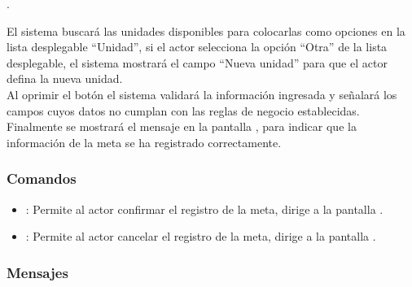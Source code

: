   \newpage .
	\newpage  
	\newpage  
  	\newpage
	\newpage
  
  El sistema buscará las unidades disponibles para colocarlas como opciones en la lista desplegable ``Unidad'', si el actor selecciona la opción ``Otra'' de la lista desplegable, el sistema mostrará
  el campo ``Nueva unidad'' para que el actor defina la nueva unidad.\\
  
  Al oprimir el botón  el sistema validará la información ingresada y señalará los campos cuyos datos no cumplan con las reglas de negocio establecidas.\\
  
  Finalmente se mostrará el mensaje  en la pantalla , para indicar que la información de la
  meta se ha registrado correctamente.
    
\subsubsection{Comandos}
\begin{itemize}
	\item {}: Permite al actor confirmar el registro de la meta, dirige a la pantalla .
	\item {}: Permite al actor cancelar el registro de la meta, dirige a la pantalla .
\end{itemize}


\subsubsection{Mensajes}

